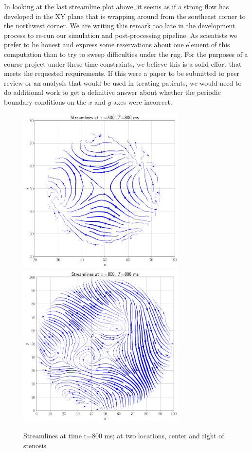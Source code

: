 \documentclass[11pt]{article} %
\begin{document}
In looking at the last streamline plot above, it seems as if a strong flow has developed
in the XY plane that is wrapping around from the southeast corner to the northwest corner.
We are writing this remark too late in the development process 
to re-run our simulation and post-processing pipeline.  
As scientists we prefer to be honest and express some reservations about one element of this
computation than to try to sweep difficulties under the rug.
For the purposes of a course project under these time constraints, we believe this is a 
solid effort that meets the requested requirements.  
If this were a paper to be submitted to peer review or an analysis that would be used
in treating patients, we would need to do additional work to get a definitive answer about
whether the periodic boundary conditions on the $x$ and $y$ axes were incorrect.

\begin{figure}[h!]
\centering
\hspace*{-0.25in}
\vspace*{-0.50in}
\includegraphics[width=0.75\textwidth]{streamlines/streamlines_z_500_t_800.png}
\includegraphics[width=0.75\textwidth]{streamlines/streamlines_z_800_t_800.png}
\caption{Streamlines at time t=800 ms; at two locations, center and right of stenosis}
\end{figure}
\end{document}
